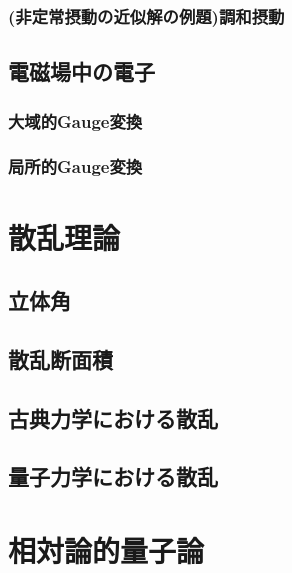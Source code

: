 \documentclass{report}
\begin{document}
      \subsection{(非定常摂動の近似解の例題)調和摂動}
        
    \section{電磁場中の電子}
      
      \subsection{大域的Gauge変換}
        
      \subsection{局所的Gauge変換}
        
  \chapter{散乱理論}
    \section{立体角}
      
    \section{散乱断面積}
      
    \section{古典力学における散乱}
      
    \section{量子力学における散乱}
      
  \chapter{相対論的量子論}
\end{document}
